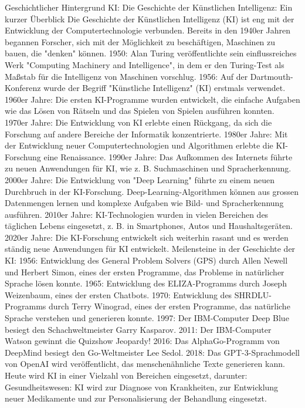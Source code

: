 Geschichtlicher Hintergrund KI:
Die Geschichte der Künstlichen Intelligenz: Ein kurzer Überblick
Die Geschichte der Künstlichen Intelligenz (KI) ist eng mit der Entwicklung der Computertechnologie verbunden. Bereits in den 1940er Jahren begannen Forscher, sich mit der Möglichkeit zu beschäftigen, Maschinen zu bauen, die "denken" können.
1950: Alan Turing veröffentlichte sein einflussreiches Werk "Computing Machinery and Intelligence", in dem er den Turing-Test als Maßstab für die Intelligenz von Maschinen vorschlug.
1956: Auf der Dartmouth-Konferenz wurde der Begriff "Künstliche Intelligenz" (KI) erstmals verwendet.
1960er Jahre: Die ersten KI-Programme wurden entwickelt, die einfache Aufgaben wie das Lösen von Rätseln und das Spielen von Spielen ausführen konnten.
1970er Jahre: Die Entwicklung von KI erlebte einen Rückgang, da sich die Forschung auf andere Bereiche der Informatik konzentrierte.
1980er Jahre: Mit der Entwicklung neuer Computertechnologien und Algorithmen erlebte die KI-Forschung eine Renaissance.
1990er Jahre: Das Aufkommen des Internets führte zu neuen Anwendungen für KI, wie z. B. Suchmaschinen und Spracherkennung.
2000er Jahre: Die Entwicklung von "Deep Learning" führte zu einem neuen Durchbruch in der KI-Forschung. Deep-Learning-Algorithmen können aus grossen Datenmengen lernen und komplexe Aufgaben wie Bild- und Spracherkennung ausführen.
2010er Jahre: KI-Technologien wurden in vielen Bereichen des täglichen Lebens eingesetzt, z. B. in Smartphones, Autos und Haushaltsgeräten.
2020er Jahre: Die KI-Forschung entwickelt sich weiterhin rasant und es werden ständig neue Anwendungen für KI entwickelt.
Meilensteine in der Geschichte der KI:
1956: Entwicklung des General Problem Solvers (GPS) durch Allen Newell und Herbert Simon, eines der ersten Programme, das Probleme in natürlicher Sprache lösen konnte.
1965: Entwicklung des ELIZA-Programms durch Joseph Weizenbaum, eines der ersten Chatbots.
1970: Entwicklung des SHRDLU-Programms durch Terry Winograd, eines der ersten Programme, das natürliche Sprache verstehen und generieren konnte.
1997: Der IBM-Computer Deep Blue besiegt den Schachweltmeister Garry Kasparov.
2011: Der IBM-Computer Watson gewinnt die Quizshow Jeopardy!
2016: Das AlphaGo-Programm von DeepMind besiegt den Go-Weltmeister Lee Sedol.
2018: Das GPT-3-Sprachmodell von OpenAI wird veröffentlicht, das menschenähnliche Texte generieren kann.
Heute wird KI in einer Vielzahl von Bereichen eingesetzt, darunter:
Gesundheitswesen: KI wird zur Diagnose von Krankheiten, zur Entwicklung neuer Medikamente und zur Personalisierung der Behandlung eingesetzt.
